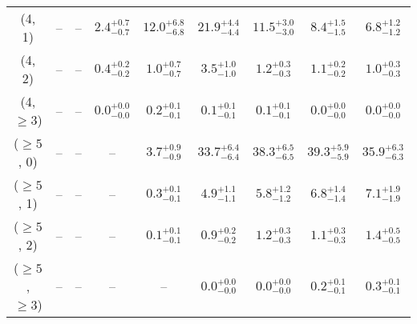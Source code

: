 \begin{table}[h!]
{\begin{tabular}{ccccccccc}
	(4, 1) & -- & -- & $2.4^{+ 0.7 }_{- 0.7 }$ & $12.0^{+ 6.8 }_{- 6.8 }$ & $21.9^{+ 4.4 }_{- 4.4 }$ & $11.5^{+ 3.0 }_{- 3.0 }$ & $8.4^{+ 1.5 }_{- 1.5 }$ & $6.8^{+ 1.2 }_{- 1.2 }$ \\[0.5ex] 
	(4, 2) & -- & -- & $0.4^{+ 0.2 }_{- 0.2 }$ & $1.0^{+ 0.7 }_{- 0.7 }$ & $3.5^{+ 1.0 }_{- 1.0 }$ & $1.2^{+ 0.3 }_{- 0.3 }$ & $1.1^{+ 0.2 }_{- 0.2 }$ & $1.0^{+ 0.3 }_{- 0.3 }$ \\[0.5ex] 
	(4, $\ge3$) & -- & -- & $0.0^{+ 0.0 }_{- 0.0 }$ & $0.2^{+ 0.1 }_{- 0.1 }$ & $0.1^{+ 0.1 }_{- 0.1 }$ & $0.1^{+ 0.1 }_{- 0.1 }$ & $0.0^{+ 0.0 }_{- 0.0 }$ & $0.0^{+ 0.0 }_{- 0.0 }$ \\[0.5ex] 
	($\ge5$, 0) & -- & -- & -- & $3.7^{+ 0.9 }_{- 0.9 }$ & $33.7^{+ 6.4 }_{- 6.4 }$ & $38.3^{+ 6.5 }_{- 6.5 }$ & $39.3^{+ 5.9 }_{- 5.9 }$ & $35.9^{+ 6.3 }_{- 6.3 }$ \\[0.5ex] 
	($\ge5$, 1) & -- & -- & -- & $0.3^{+ 0.1 }_{- 0.1 }$ & $4.9^{+ 1.1 }_{- 1.1 }$ & $5.8^{+ 1.2 }_{- 1.2 }$ & $6.8^{+ 1.4 }_{- 1.4 }$ & $7.1^{+ 1.9 }_{- 1.9 }$ \\[0.5ex] 
	($\ge5$, 2) & -- & -- & -- & $0.1^{+ 0.1 }_{- 0.1 }$ & $0.9^{+ 0.2 }_{- 0.2 }$ & $1.2^{+ 0.3 }_{- 0.3 }$ & $1.1^{+ 0.3 }_{- 0.3 }$ & $1.4^{+ 0.5 }_{- 0.5 }$ \\[0.5ex] 
	($\ge5$, $\ge3$) & -- & -- & -- & -- & $0.0^{+ 0.0 }_{- 0.0 }$ & $0.0^{+ 0.0 }_{- 0.0 }$ & $0.2^{+ 0.1 }_{- 0.1 }$ & $0.3^{+ 0.1 }_{- 0.1 }$ \\[0.5ex] 
	\hline
	\hline
\end{tabular}}
\end{table}
